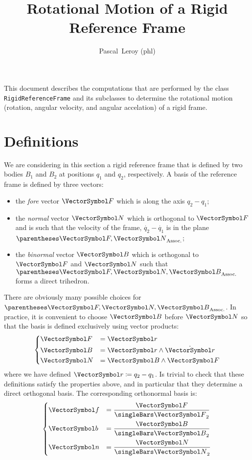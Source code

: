 \documentclass[10pt, a4paper, twoside]{basestyle}
\title{Rotational Motion of a Rigid Reference Frame}
\date{\printdate{2020-06-03}}
\author{Pascal~Leroy (phl)}
\begin{document}
\maketitle
\begin{sloppypar}
\noindent
This document describes the computations that are performed by the class \texttt{RigidReferenceFrame} and its subclasses to determine the rotational motion (rotation,
angular velocity, and angular accelation) of a rigid frame.
\end{sloppypar}

\section*{Definitions}
We are considering in this section a rigid reference frame that is defined by two bodies $B_1$ and $B_2$ at positions $q_1$ and $q_2$, respectively.  A basis of the reference frame is defined by three vectors:
\begin{itemize}
\item{the \emph{fore} vector $\vF$ which is along the axis $q_2 - q_1$;}
\item{the \emph{normal} vector $\vN$ which is orthogonal to $\vF$ and is such that the velocity of the frame, $\dot{q_2} - \dot{q_1}$ is in the plane $\pa{\vF, \vN}$;}
\item{the \emph{binormal} vector $\vB$ which is orthogonal to $\vF$ and $\vN$ such that $\pa{\vF, \vN, \vB}$ forms a direct trihedron.}
\end{itemize}
There are obviously many possible choices for $\pa{\vF, \vN, \vB}$.  In practice, it is convenient to choose $\vB$ before $\vN$ so that the basis is defined exclusively using vector products:
\begin{equation}
\begin{dcases}
\vF &= \vr \\
\vB &= \vr \wedge \dot{\vr} \\
\vN &= \vB \wedge \vF
\end{dcases}
\label{eqnFBN}
\end{equation}
where we have defined $\vr \DefineAs q_2 - q_1$.  Is trivial to check that these definitions satisfy the properties above, and in particular that they determine a direct orthogonal basis.  The corresponding orthonormal basis is:
\begin{equation}
\begin{dcases}
\vf &= \frac{\vF}{\norm\vF} \\
\vb &= \frac{\vB}{\norm\vB} \\
\vn &= \frac{\vN}{\norm\vN}
\end{dcases}
\label{eqnfbn}
\end{equation}
\end{document}
